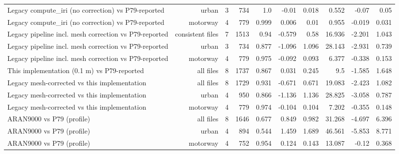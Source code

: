 \begin{table}[!htbp]
\begin{adjustbox}{max width=\columnwidth}
\begin{tabular}{lrrrrrrrrr}
Legacy compute\_iri (no correction) vs P79-reported & urban & 3 & 734 & 1.0 & -0.01 & 0.018 & 0.552 & -0.07 & 0.05 \\
Legacy compute\_iri (no correction) vs P79-reported & motorway & 4 & 779 & 0.999 & 0.006 & 0.01 & 0.955 & -0.019 & 0.031 \\
Legacy pipeline incl. mesh correction vs P79-reported & consistent files & 7 & 1513 & 0.94 & -0.579 & 0.58 & 16.936 & -2.201 & 1.043 \\
Legacy pipeline incl. mesh correction vs P79-reported & urban & 3 & 734 & 0.877 & -1.096 & 1.096 & 28.143 & -2.931 & 0.739 \\
Legacy pipeline incl. mesh correction vs P79-reported & motorway & 4 & 779 & 0.975 & -0.092 & 0.093 & 6.377 & -0.338 & 0.153 \\
This implementation (0.1 m) vs P79-reported & all files & 8 & 1737 & 0.867 & 0.031 & 0.245 & 9.5 & -1.585 & 1.648 \\
Legacy mesh-corrected vs this implementation & all files & 8 & 1729 & 0.931 & -0.671 & 0.671 & 19.083 & -2.423 & 1.082 \\
Legacy mesh-corrected vs this implementation & urban & 4 & 950 & 0.866 & -1.136 & 1.136 & 28.825 & -3.058 & 0.787 \\
Legacy mesh-corrected vs this implementation & motorway & 4 & 779 & 0.974 & -0.104 & 0.104 & 7.202 & -0.355 & 0.148 \\
ARAN9000 vs P79 (profile) & all files & 8 & 1646 & 0.677 & 0.849 & 0.982 & 31.268 & -4.697 & 6.396 \\
ARAN9000 vs P79 (profile) & urban & 4 & 894 & 0.544 & 1.459 & 1.689 & 46.561 & -5.853 & 8.771 \\
ARAN9000 vs P79 (profile) & motorway & 4 & 752 & 0.954 & 0.124 & 0.143 & 13.087 & -0.12 & 0.368 \\
\bottomrule
\end{tabular}
\end{adjustbox}
\end{table}

